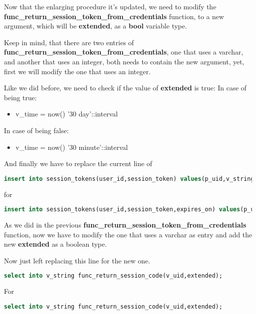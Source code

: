 \begin{flushleft}

    Now that the enlarging procedure it's updated, we need to modify the \textbf{func\_return\_session\_token\_from\_credentials}
    function, to a new argument, which will be \textbf{extended}, as a \textbf{bool} variable type.

\end{flushleft}
\begin{flushleft}

    Keep in mind, that there are two entries of \textbf{func\_return\_session\_token\_from\_credentials},
    one that uses a varchar, and another that uses an integer, both needs to contain the new argument, yet, first we
    will modify the one that uses an integer.

\end{flushleft}
\begin{flushleft}

    Like we did before, we need to check if the value of \textbf{extended} is true:
    In case of being true:
    \begin{itemize}
        \item v\_time = now() '30 day'::interval
    \end{itemize}
    In case of being false:
    \begin{itemize}
        \item v\_time = now() '30 minute'::interval
    \end{itemize}
    And finally we have to replace the current line of
    \begin{lstlisting}[language=sql,label={lst:sql_extended3}]
insert into session_tokens(user_id,session_token) values(p_uid,v_string);\end{lstlisting}
    for
    \begin{lstlisting}[language=sql,label={lst:sql_extended4}]
insert into session_tokens(user_id,session_token,expires_on) values(p_uid,v_string,v_time);\end{lstlisting}

\end{flushleft}
\begin{flushleft}

    As we did in the previous \textbf{func\_return\_session\_token\_from\_credentials} function, now we have to modify
    the one that uses a varchar as entry and add the new \textbf{extended} as a boolean type.

    Now just left replacing this line for the new one.
    \begin{lstlisting}[language=sql,label={lst:sql_extended5}]
select into v_string func_return_session_code(v_uid,extended);\end{lstlisting}
    For
    \begin{lstlisting}[language=sql,label={lst:sql_extended6}]
select into v_string func_return_session_code(v_uid,extended);\end{lstlisting}

\end{flushleft}

